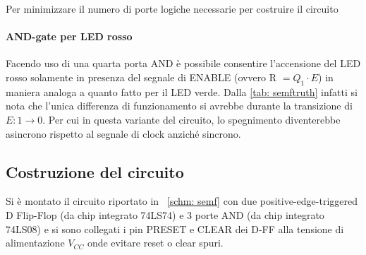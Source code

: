 \documentclass[10pt, a4paper, italian]{article}
\begin{document}
Per minimizzare il numero di porte logiche necessarie per costruire il circuito

\paragraph{AND-gate per LED rosso}
Facendo uso di una quarta porta AND è possibile consentire l'accensione del LED
rosso solamente in presenza del segnale di ENABLE (ovvero R $= Q_1 \cdot E$) in
maniera analoga a quanto fatto per il LED verde.
Dalla \cref{tab: semftruth} infatti si nota che l'unica differenza di
funzionamento si avrebbe durante la transizione di $E: 1 \to 0$.
Per cui in questa variante del circuito, lo spegnimento diventerebbe asincrono
rispetto al segnale di clock anziché sincrono.

\subsection{Costruzione del circuito}
Si è montato il circuito riportato in ~\cref{schm: semf} con due
positive-edge-triggered D Flip-Flop (da chip integrato 74LS74) e 3 porte AND
(da chip integrato 74LS08) e si sono collegati i pin PRESET e CLEAR dei D-FF
alla tensione di alimentazione $V_{CC}$ onde evitare reset o clear spuri.
\end{document}
